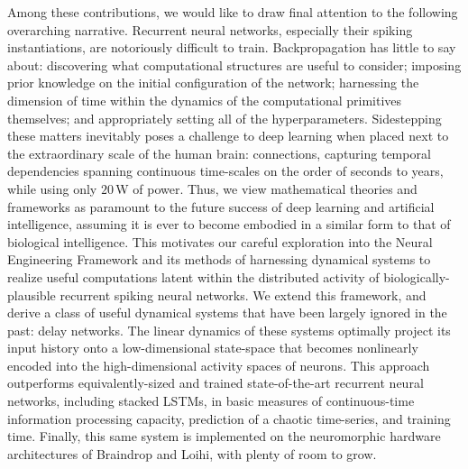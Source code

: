 Among these contributions, we would like to draw final attention to the following overarching narrative.
Recurrent neural networks, especially their spiking instantiations, are notoriously difficult to train.
Backpropagation has little to say about: discovering what computational structures are useful to consider; imposing prior knowledge on the initial configuration of the network; harnessing the dimension of time within the dynamics of the computational primitives themselves; and appropriately setting all of the hyperparameters.
Sidestepping these matters inevitably poses a challenge to deep learning when placed next to the extraordinary scale of the human brain:  connections, capturing temporal dependencies spanning continuous time-scales on the order of seconds to years, while using only $20$\,W of power.
Thus, we view mathematical theories and frameworks as paramount to the future success of deep learning and artificial intelligence, assuming it is ever to become embodied in a similar form to that of biological intelligence.
This motivates our careful exploration into the Neural Engineering Framework and its methods of harnessing dynamical systems to realize useful computations latent within the distributed activity of biologically-plausible recurrent spiking neural networks.
We extend this framework, and derive a class of useful dynamical systems that have been largely ignored in the past: delay networks.
The linear dynamics of these systems optimally project its input history onto a low-dimensional state-space that becomes nonlinearly encoded into the high-dimensional activity spaces of neurons.
This approach outperforms equivalently-sized and trained state-of-the-art recurrent neural networks, including stacked LSTMs, in basic measures of continuous-time information processing capacity, prediction of a chaotic time-series, and training time.
Finally, this same system is implemented on the neuromorphic hardware architectures of Braindrop and Loihi, with plenty of room to grow.


